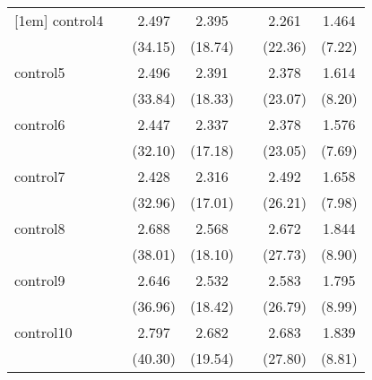 {\begin{tabular}{l*{6}{c}}
[1em]
control4    &                     &       2.497\sym{***}&       2.395\sym{***}&                     &       2.261\sym{***}&       1.464\sym{***}\\
            &                     &     (34.15)         &     (18.74)         &                     &     (22.36)         &      (7.22)         \\
[1em]
control5    &                     &       2.496\sym{***}&       2.391\sym{***}&                     &       2.378\sym{***}&       1.614\sym{***}\\
            &                     &     (33.84)         &     (18.33)         &                     &     (23.07)         &      (8.20)         \\
[1em]
control6    &                     &       2.447\sym{***}&       2.337\sym{***}&                     &       2.378\sym{***}&       1.576\sym{***}\\
            &                     &     (32.10)         &     (17.18)         &                     &     (23.05)         &      (7.69)         \\
[1em]
control7    &                     &       2.428\sym{***}&       2.316\sym{***}&                     &       2.492\sym{***}&       1.658\sym{***}\\
            &                     &     (32.96)         &     (17.01)         &                     &     (26.21)         &      (7.98)         \\
[1em]
control8    &                     &       2.688\sym{***}&       2.568\sym{***}&                     &       2.672\sym{***}&       1.844\sym{***}\\
            &                     &     (38.01)         &     (18.10)         &                     &     (27.73)         &      (8.90)         \\
[1em]
control9    &                     &       2.646\sym{***}&       2.532\sym{***}&                     &       2.583\sym{***}&       1.795\sym{***}\\
            &                     &     (36.96)         &     (18.42)         &                     &     (26.79)         &      (8.99)         \\
[1em]
control10   &                     &       2.797\sym{***}&       2.682\sym{***}&                     &       2.683\sym{***}&       1.839\sym{***}\\
            &                     &     (40.30)         &     (19.54)         &                     &     (27.80)         &      (8.81)         \\

\end{tabular}}
